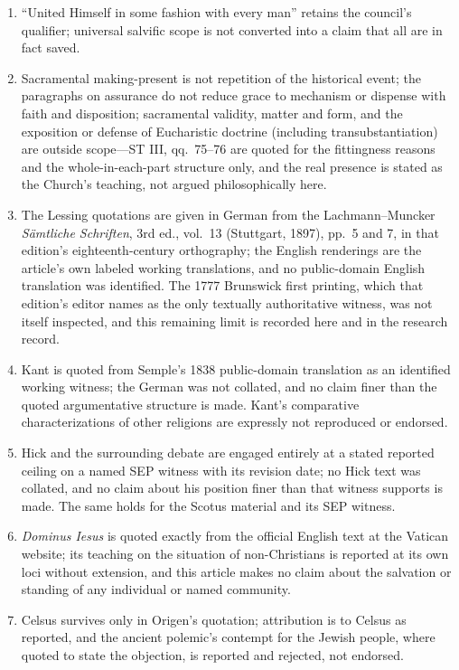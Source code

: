 \begin{enumerate}
\item ``United Himself in some fashion with every man'' retains the council's qualifier; universal salvific scope is not converted into a claim that all are in fact saved.
\item Sacramental making-present is not repetition of the historical event; the paragraphs on assurance do not reduce grace to mechanism or dispense with faith and disposition; sacramental validity, matter and form, and the exposition or defense of Eucharistic doctrine (including transubstantiation) are outside scope---ST III, qq.~75--76 are quoted for the fittingness reasons and the whole-in-each-part structure only, and the real presence is stated as the Church's teaching, not argued philosophically here.
\item The Lessing quotations are given in German from the Lachmann--Muncker \emph{S\"amtliche Schriften}, 3rd ed., vol.~13 (Stuttgart, 1897), pp.~5 and 7, in that edition's eighteenth-century orthography; the English renderings are the article's own labeled working translations, and no public-domain English translation was identified. The 1777 Brunswick first printing, which that edition's editor names as the only textually authoritative witness, was not itself inspected, and this remaining limit is recorded here and in the research record.
\item Kant is quoted from Semple's 1838 public-domain translation as an identified working witness; the German was not collated, and no claim finer than the quoted argumentative structure is made. Kant's comparative characterizations of other religions are expressly not reproduced or endorsed.
\item Hick and the surrounding debate are engaged entirely at a stated reported ceiling on a named SEP witness with its revision date; no Hick text was collated, and no claim about his position finer than that witness supports is made. The same holds for the Scotus material and its SEP witness.
\item \emph{Dominus Iesus} is quoted exactly from the official English text at the Vatican website; its teaching on the situation of non-Christians is reported at its own loci without extension, and this article makes no claim about the salvation or standing of any individual or named community.
\item Celsus survives only in Origen's quotation; attribution is to Celsus as reported, and the ancient polemic's contempt for the Jewish people, where quoted to state the objection, is reported and rejected, not endorsed.

\end{enumerate}
